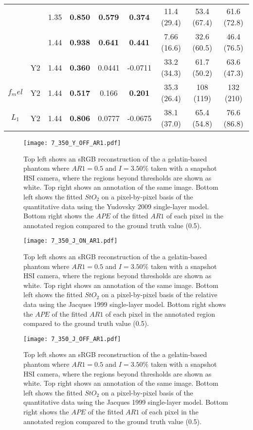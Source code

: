 \begin{table}[htb!]
\begin{tabular}{|ccc|ccc|ccc|}
        & & 1.35 & \textbf{0.850} & \textbf{0.579} & \textbf{0.374} & 11.4 (29.4) & 53.4 (67.4) & 61.6 (72.8) \\
        & & 1.44 & \textbf{0.938} & \textbf{0.641} & \textbf{0.441} & 7.66 (16.6) & 32.6 (60.5) & 46.4 (76.5) \\
        \cline{2-9}
        & Y2 & 1.44 & \textbf{0.360} & 0.0441 & -0.0711 & 33.2 (34.3) & 61.7 (50.2) & 63.6 (47.3) \\
        \hline
        $f_mel$ & Y2 & 1.44 & \textbf{0.517} & 0.166 & \textbf{0.201} & 35.3 (26.4) & 108 (119) & 132 (210) \\
        \hline
        $L_1$ & Y2 & 1.44 & \textbf{0.806} & 0.0777 & -0.0675 & 38.1 (37.0) & 65.4 (54.8) & 76.6 (86.8) \\
        \hline
    \end{tabular}    
    \label{ap:backwardsHSIMCr}
\end{table}

\begin{figure}[h!]
    \centering 
    \texttt{[image: 7\_350\_Y\_OFF\_AR1.pdf]}
    \caption{Top left shows an sRGB reconstruction of the a gelatin-based phantom where $AR1=0.5$ and $I=3.50\%$ taken with a snapshot HSI camera, where the regions beyond thresholds are shown as white. Top right shows an annotation of the same image. Bottom left shows the fitted $StO_2$ on a pixel-by-pixel basis of the quantitative data using the Yudovsky 2009 single-layer model. Bottom right shows the $APE$ of the fitted $AR1$ of each pixel in the annotated region compared to the ground truth value (0.5).}
    \label{ap:gelatinpbpegQY}
\end{figure}

\begin{figure}[h!]
    \centering 
    \texttt{[image: 7\_350\_J\_ON\_AR1.pdf]}
    \caption{Top left shows an sRGB reconstruction of the a gelatin-based phantom where $AR1=0.5$ and $I=3.50\%$ taken with a snapshot HSI camera, where the regions beyond thresholds are shown as white. Top right shows an annotation of the same image. Bottom left shows the fitted $StO_2$ on a pixel-by-pixel basis of the relative data using the Jacques 1999 single-layer model. Bottom right shows the $APE$ of the fitted $AR1$ of each pixel in the annotated region compared to the ground truth value (0.5).}
    \label{ap:gelatinpbpegRJ}
\end{figure}

\begin{figure}[h!]
    \centering 
    \texttt{[image: 7\_350\_J\_OFF\_AR1.pdf]}
    \caption{Top left shows an sRGB reconstruction of the a gelatin-based phantom where $AR1=0.5$ and $I=3.50\%$ taken with a snapshot HSI camera, where the regions beyond thresholds are shown as white. Top right shows an annotation of the same image. Bottom left shows the fitted $StO_2$ on a pixel-by-pixel basis of the quantitative data using the Jacques 1999 single-layer model. Bottom right shows the $APE$ of the fitted $AR1$ of each pixel in the annotated region compared to the ground truth value (0.5).}
    \label{ap:gelatinpbpegQJ}
\end{figure}

